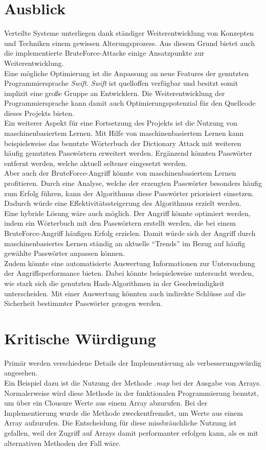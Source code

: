 \section{Ausblick}
\label{ausblick}
Verteilte Systeme unterliegen dank ständiger Weiterentwicklung von Konzepten und Techniken einem gewissen Alterungsprozess. Aus diesem Grund bietet auch die implementierte BruteForce-Attacke einige Ansatzpunkte zur Weiterentwicklung. \\
Eine mögliche Optimierung ist die Anpassung an neue Features der genutzten Programmiersprache \emph{Swift}. \emph{Swift} ist quelloffen verfügbar und besitzt somit implizit eine große Gruppe an Entwicklern. Die Weiterentwicklung der Programmiersprache kann damit auch Optimierungspotenzial für den Quellcode dieses Projekts bieten. \\
Ein weiterer Aspekt für eine Fortsetzung des Projekts ist die Nutzung von maschinenbasiertem Lernen. Mit Hilfe von maschinenbasiertem Lernen kann beispielsweise das benutzte Wörterbuch der Dictionary Attack mit weiteren häufig genutzten Passwörtern erweitert werden. Ergänzend könnten Passwörter entfernt werden, welche aktuell seltener eingesetzt werden.\\

 Aber auch der BruteForce-Angriff könnte von maschinenbasiertem Lernen profitieren. Durch eine Analyse, welche der erzeugten Passwörter besonders häufig zum Erfolg führen, kann der Algorithmus diese Passwörter priorisiert einsetzen. Dadurch würde eine Effektivitätssteigerung des Algorithmus erzielt werden. \\
 
Eine hybride Lösung wäre auch möglich. Der Angriff könnte optimiert werden, indem ein Wörterbuch mit den Passwörtern erstellt werden, die bei einem BruteForce-Angriff häufigen Erfolg erzielen. Damit würde sich der Angriff durch maschinenbasiertes Lernen ständig an aktuelle \enquote{Trends} im Bezug auf häufig gewählte Passwörter anpassen können. \\
Zudem könnte eine automatisierte Auswertung Informationen zur Untersuchung der Angriffsperformance bieten. Dabei könnte beispielsweise untersucht werden, wie stark sich die genutzten Hash-Algorithmen in der Geschwindigkeit unterscheiden. Mit einer Auswertung könnten auch indirekte Schlüsse auf die Sicherheit bestimmter Passwörter gezogen werden. 

\section{Kritische Würdigung}
\label{kritik}
Primär werden verschiedene Details der Implementierung als verbesserungswürdig angesehen. \\
Ein Beispiel dazu ist die Nutzung der Methode \emph{.map} bei der Ausgabe von Arrays. Normalerweise wird diese Methode in der funktionalen Programmierung benutzt, um über ein Clousure Werte aus einem Array abzurufen. Bei der Implementierung wurde die Methode zweckentfremdet, um Werte aus einem Array aufzurufen. Die Entscheidung für diese missbräuchliche Nutzung ist gefallen, weil der Zugriff auf Arrays damit performanter erfolgen kann, als es mit alternativen Methoden der Fall wäre. \\

